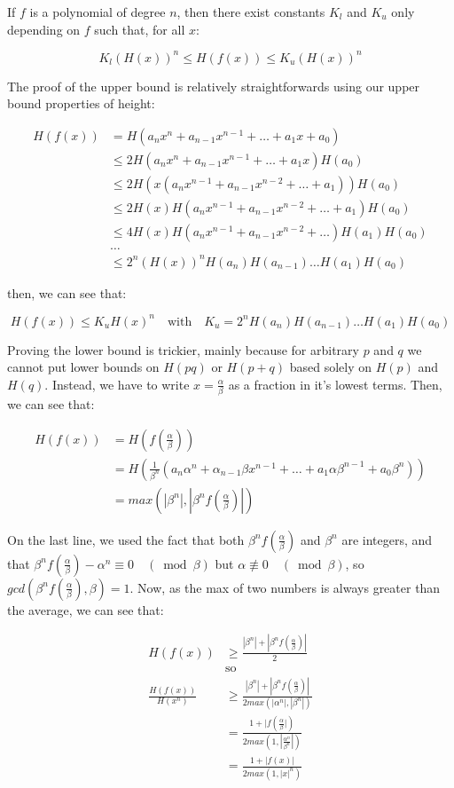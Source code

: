 \documentclass{article}
\begin{document}
If $f$ is a polynomial of degree $n$, then there exist constants $K_l$ and $K_u$ only depending on $f$ such that, for all $x$:

\[ K_l (H(x))^n \leq H(f(x)) \leq K_u (H(x))^n \]

The proof of the upper bound is relatively straightforwards using our upper bound properties of height:

\begin{align*} 
H(f(x)) &= H(a_n x^n + a_{n-1}x^{n-1} + \dots + a_1 x + a_0)\\
&\leq 2H(a_n x^n + a_{n-1}x^{n-1} + \dots + a_1 x)H(a_0)\\
&\leq 2H(x(a_n x^{n-1} + a_{n-1}x^{n-2} + \dots + a_1))H(a_0)\\
&\leq 2H(x)H(a_n x^{n-1} + a_{n-1}x^{n-2} + \dots + a_1)H(a_0)\\
&\leq 4H(x)H(a_n x^{n-1} + a_{n-1}x^{n-2} + \dots)H(a_1)H(a_0)\\
&\dots\\
&\leq 2^n (H(x))^n H(a_n)H(a_{n-1})\dots H(a_1)H(a_0)
\end{align*} 

then, we can see that:

\[ H(f(x)) \leq K_u H(x)^n \quad \text{with} \quad K_u = 2^n H(a_n)H(a_{n-1})\dots H(a_1)H(a_0) \]

Proving the lower bound is trickier, mainly because for arbitrary $p$ and $q$ we cannot put lower bounds on $H(pq)$ or $H(p + q)$ based solely on $H(p)$ and $H(q)$. Instead, we have to write $x = \frac{\alpha}{\beta}$ as a fraction in it's lowest terms. Then, we can see that:

\begin{align*}
    H(f(x)) &= H(f(\frac{\alpha}{\beta}))\\
            &= H(\frac{1}{\beta^n}(a_n \alpha^n + \alpha_{n-1} \beta x^{n-1} + \dots + a_1 \alpha \beta^{n-1} + a_0 \beta^n))\\
            &= max(|\beta^n|, |\beta^n f(\frac{\alpha}{\beta})|)\
\end{align*}

On the last line, we used the fact that both $\beta^n f(\frac{\alpha}{\beta})$ and $\beta^n$ are integers, and that $\beta^n f(\frac{\alpha}{\beta}) - \alpha^n \equiv 0 \quad (\bmod{\beta})$ but $\alpha \not\equiv 0 \quad (\bmod{\beta})$, so $gcd(\beta^n f(\frac{\alpha}{\beta}), \beta) = 1$. Now, as the max of two numbers is always greater than the average, we can see that:

\begin{align*}
    H(f(x)) & \geq \frac{|\beta^n| + |\beta^n f(\frac{\alpha}{\beta})|}{2}\\
    &\text{so}\\
    \frac{H(f(x))}{H(x^n)} &\geq \frac{|\beta^n| + |\beta^n f(\frac{\alpha}{\beta})|}{2 max(|\alpha^n|,|\beta^n|)}\\
                        &= \frac{1 + |f(\frac{\alpha}{\beta}|)}{2 max(1, |\frac{\alpha^n}{\beta^n}|)}\\
                        &= \frac{1 + |f(x)|}{2 max(1, |x|^n)}
\end{align*}
\end{document}
